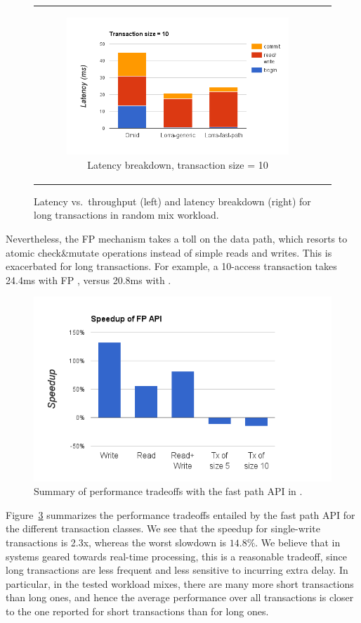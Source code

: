 \begin{figure}[t]
\begin{tabular}{cc}
  \begin{subfigure}[t]{0.5\textwidth}
	\includegraphics[width=.9\textwidth]{figs/stack-tx10.png}
	\caption[]{Latency breakdown, transaction size = 10}
    \label{fig:stack-tx10}
  \end{subfigure} 
\end{tabular}  			
  \caption{Latency vs.\ throughput (left) and latency breakdown (right) for long transactions in random mix workload. }
  \label{fig:throughput-latency}
\end{figure}

Nevertheless,
the FP mechanism takes a toll on the data path, which resorts to atomic check\&mutate operations 
instead of simple reads and writes. This is exacerbated for long transactions. 
For example, a 10-access transaction takes 24.4ms with FP \sys, 
versus 20.8ms with \sys. 

\begin{figure}[tbh]
\centering
\includegraphics[width=.4\textwidth]{figs/speedup.png}
\caption{Summary of performance tradeoffs with the fast path API in {\sys}.}
\label{fig:fp-tradeoff}
\end{figure}


Figure~\ref{fig:fp-tradeoff} summarizes the performance tradeoffs entailed by the fast path API
for the different transaction classes. 
We see that the speedup for single-write transactions is 2.3x, whereas the worst slowdown is $14.8\%$. 
We believe that in systems geared towards real-time processing, this is a reasonable tradeoff, since long transactions 
are less frequent and less sensitive to incurring extra delay.
In particular, in the tested workload mixes, there are many more short transactions than long ones, and hence the average
performance over all transactions is closer to the one reported for short transactions than for long ones.  
